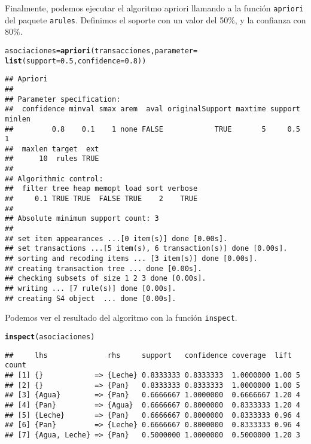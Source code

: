 \documentclass[12pt]{report}\usepackage[]{graphicx}\usepackage[dvipsnames]{xcolor}
\makeatletter
\newcommand{\hlnum}[1]{\textcolor[rgb]{0.686,0.059,0.569}{#1}}%
\newcommand{\hlstd}[1]{\textcolor[rgb]{0.345,0.345,0.345}{#1}}%
\newcommand{\hlkwb}[1]{\textcolor[rgb]{0.69,0.353,0.396}{#1}}%
\newcommand{\hlkwc}[1]{\textcolor[rgb]{0.333,0.667,0.333}{#1}}%
\newcommand{\hlkwd}[1]{\textcolor[rgb]{0.737,0.353,0.396}{\textbf{#1}}}%
\newenvironment{kframe}{%
 \def\at@end@of@kframe{}%
 \ifinner\ifhmode%
  \def\at@end@of@kframe{\end{minipage}}%
  \begin{minipage}{\columnwidth}%
 \fi\fi%
 \def\FrameCommand##1{\hskip\@totalleftmargin \hskip-\fboxsep
 \colorbox{shadecolor}{##1}\hskip-\fboxsep
     \hskip-\linewidth \hskip-\@totalleftmargin \hskip\columnwidth}%
 \MakeFramed {\advance\hsize-\width
   \@totalleftmargin\z@ \linewidth\hsize
   \@setminipage}}%
 {\par\unskip\endMakeFramed%
 \at@end@of@kframe}
\newenvironment{knitrout}{}{} %
\makeatother
\begin{document}
			Finalmente, podemos ejecutar el algoritmo apriori llamando a la función \texttt{apriori} del paquete \texttt{arules}. Definimos el soporte con un valor del 50\%, y la confianza con 80\%. 
			
\begin{knitrout}
\color{fgcolor}\begin{kframe}
\begin{alltt}
\hlstd{asociaciones} \hlkwb{=} \hlkwd{apriori}\hlstd{(transacciones,} \hlkwc{parameter} \hlstd{=}
\hlkwd{list}\hlstd{(}\hlkwc{support} \hlstd{=} \hlnum{0.5}\hlstd{,} \hlkwc{confidence} \hlstd{=} \hlnum{0.8}\hlstd{))}
\end{alltt}
\begin{verbatim}
## Apriori
## 
## Parameter specification:
##  confidence minval smax arem  aval originalSupport maxtime support minlen
##         0.8    0.1    1 none FALSE            TRUE       5     0.5      1
##  maxlen target  ext
##      10  rules TRUE
## 
## Algorithmic control:
##  filter tree heap memopt load sort verbose
##     0.1 TRUE TRUE  FALSE TRUE    2    TRUE
## 
## Absolute minimum support count: 3 
## 
## set item appearances ...[0 item(s)] done [0.00s].
## set transactions ...[5 item(s), 6 transaction(s)] done [0.00s].
## sorting and recoding items ... [3 item(s)] done [0.00s].
## creating transaction tree ... done [0.00s].
## checking subsets of size 1 2 3 done [0.00s].
## writing ... [7 rule(s)] done [0.00s].
## creating S4 object  ... done [0.00s].
\end{verbatim}
\end{kframe}
\end{knitrout}
			
			Podemos ver el resultado del algoritmo con la función \texttt{inspect}. 
			
\begin{knitrout}
\color{fgcolor}\begin{kframe}
\begin{alltt}
\hlkwd{inspect}\hlstd{(asociaciones)}
\end{alltt}
\begin{verbatim}
##     lhs              rhs     support   confidence coverage  lift count
## [1] {}            => {Leche} 0.8333333 0.8333333  1.0000000 1.00 5    
## [2] {}            => {Pan}   0.8333333 0.8333333  1.0000000 1.00 5    
## [3] {Agua}        => {Pan}   0.6666667 1.0000000  0.6666667 1.20 4    
## [4] {Pan}         => {Agua}  0.6666667 0.8000000  0.8333333 1.20 4    
## [5] {Leche}       => {Pan}   0.6666667 0.8000000  0.8333333 0.96 4    
## [6] {Pan}         => {Leche} 0.6666667 0.8000000  0.8333333 0.96 4    
## [7] {Agua, Leche} => {Pan}   0.5000000 1.0000000  0.5000000 1.20 3
\end{verbatim}
\end{kframe}
\end{knitrout}
			
\end{document}

